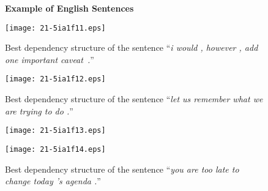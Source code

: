 \documentclass[english]{jnlp_1.4}
\begin{document}
\begin{figure}[p]
\noindent
\large\textbf{Example of English Sentences}
\vspace{1\Cvs}
\begin{center}
\texttt{[image: 21-5ia1f11.eps]}
\end{center}
\caption{Best dependency structure of the sentence ``{\it{i would , however , add one important caveat~.}}''}
\label{en0}
\end{figure}
\begin{figure}[p]
\begin{center}
\texttt{[image: 21-5ia1f12.eps]}
\end{center}
\caption{Best dependency structure of the sentence ``{\it{let us remember what we are trying to do .}}''}
\label{en1}
\end{figure}
\begin{figure}[p]
\begin{center}
\texttt{[image: 21-5ia1f13.eps]}
\end{center}
\label{en2}
\end{figure}
\begin{figure}[p]
\begin{center}
\texttt{[image: 21-5ia1f14.eps]}
\end{center}
\caption{Best dependency structure of the sentence ``{\it{you are too late to change today 's agenda .}}''}
\label{en3}
\end{figure}

\clearpage
\end{document}
